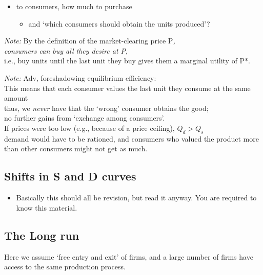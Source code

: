 \documentclass[]{article}
\providecommand{\tightlist}{%
  \setlength{\itemsep}{0pt}\setlength{\parskip}{0pt}}
\begin{document}
\begin{itemize}
\tightlist
\item
  to consumers, how much to purchase

  \begin{itemize}
  \tightlist
  \item
    and `which consumers should obtain the units produced'?
  \end{itemize}
\end{itemize}

\emph{Note:} By the definition of the market-clearing price P\emph{,\\
consumers can buy all they desire at P},\\
i.e., buy units until the last unit they buy gives them a marginal
utility of P*.

\emph{Note:} Adv, foreshadowing equilibrium efficiency:\\
This means that each consumer values the last unit they consume at the
same amount\\
thus, we \emph{never} have that the `wrong' consumer obtains the good;\\
no further gains from `exchange among consumers'.\\
If prices were too low (e.g., because of a price ceiling), \(Q_d>Q_s\)\\
demand would have to be rationed, and consumers who valued the product
more than other consumers might not get as much.

\hypertarget{shifts-in-s-and-d-curves}{%
\subsection{Shifts in S and D curves}\label{shifts-in-s-and-d-curves}}

\begin{itemize}
\tightlist
\item
  Basically this should all be revision, but read it anyway. You are
  required to know this material.
\end{itemize}

\hypertarget{the-long-run}{%
\subsection{The Long run}\label{the-long-run}}

Here we assume `free entry and exit' of firms, and a large number of
firms have access to the same production process.
\end{document}
